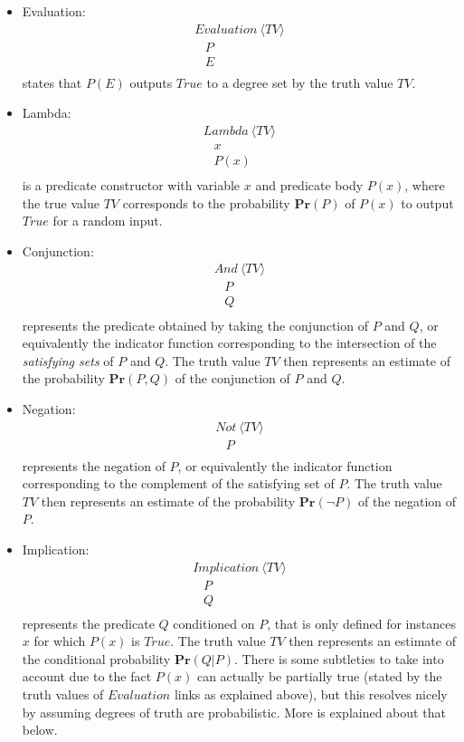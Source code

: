 \documentclass[runningheads]{llncs}
\newcommand{\SP}{\;\;\;}
\newcommand{\TTrue}{\textit{True}}
\newcommand{\TEval}{\textit{Evaluation}}
\newcommand{\TLamb}{\textit{Lambda}}
\newcommand{\TAnd}{\textit{And}}
\newcommand{\TNot}{\textit{Not}}
\newcommand{\TImpl}{\textit{Implication}}
\newcommand{\TTV}{\textit{TV}}
\newcommand{\TBTV}{\langle \TTV \rangle}
\newcommand{\prob}{\mathbf{Pr}}
\begin{document}
\begin{itemize}
\item Evaluation:
  $$
  \begin{array}{l}
    \TEval\ \TBTV\\
    \SP P\\
    \SP E\\
  \end{array}
  $$
  states that $P(E)$ outputs $\TTrue$ to a degree set by the truth value
  $\TTV$.
\item Lambda:
  $$
  \begin{array}{l}
    \TLamb\ \TBTV\\
    \SP x\\
    \SP P(x)\\
  \end{array}
  $$
  is a predicate constructor with variable $x$ and predicate body
  $P(x)$, where the true value $\TTV$ corresponds to the probability
  $\prob(P)$ of $P(x)$ to output $\TTrue$ for a random input.
\item Conjunction:
  $$
  \begin{array}{l}
    \TAnd\ \TBTV\\
    \SP P\\
    \SP Q\\
  \end{array}
  $$
  represents the predicate obtained by taking the conjunction of
  $P$ and $Q$, or equivalently the indicator function corresponding to
  the intersection of the \emph{satisfying sets} of $P$ and $Q$.
  The truth value $\TTV$ then represents an estimate of the
  probability $\prob(P,Q)$ of the conjunction of $P$ and $Q$.
\item Negation:
  $$
  \begin{array}{l}
    \TNot\ \TBTV\\
    \SP P\\
  \end{array}
  $$
  represents the negation of $P$, or equivalently the indicator
  function corresponding to the complement of the satisfying set of
  $P$. The truth value $\TTV$ then represents an estimate of
  the probability $\prob(\neg P)$ of the negation of $P$.
\item Implication:
  $$
  \begin{array}{l}
    \TImpl\ \TBTV\\
    \SP P\\
    \SP Q\\
  \end{array}
  $$
  represents the predicate $Q$ conditioned on $P$, that is only
  defined for instances $x$ for which $P(x)$ is $\TTrue$.  The truth
  value $\TTV$ then represents an estimate of the conditional
  probability $\prob(Q|P)$.  There is some subtleties to take
  into account due to the fact $P(x)$ can actually be partially true
  (stated by the truth values of $\TEval$ links as explained above),
  but this resolves nicely by assuming degrees of truth are
  probabilistic.  More is explained about that below.
\end{itemize}
\end{document}
